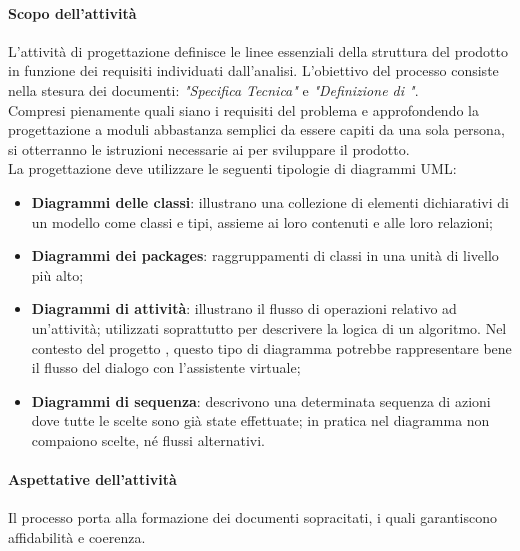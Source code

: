  \paragraph{Scopo dell'attività}
 L'attività di progettazione definisce le linee essenziali della struttura del prodotto  in
 funzione dei requisiti individuati dall'analisi. L'obiettivo del processo consiste nella stesura dei
 documenti: \textit{"Specifica Tecnica"} e \textit{"Definizione di "}. \\
 Compresi pienamente quali siano i requisiti del problema e approfondendo la progettazione a moduli
 abbastanza semplici da essere capiti da una sola persona, si otterranno le
 istruzioni necessarie ai \PRP{} per sviluppare il prodotto.\\
 La progettazione deve utilizzare le seguenti tipologie di diagrammi UML:
 \begin{itemize}
 	\item \textbf{Diagrammi delle classi}: illustrano una collezione di elementi dichiarativi di un modello	come classi e tipi, assieme ai loro contenuti e alle loro relazioni;
 	\item \textbf{Diagrammi dei packages}: raggruppamenti di classi in una unità di livello più alto;
 	\item \textbf{Diagrammi di attività}: illustrano il flusso di operazioni relativo ad un’attività; utilizzati	soprattutto per descrivere la logica di un algoritmo. Nel contesto del progetto \PROGETTO, questo tipo di diagramma potrebbe rappresentare bene il flusso del dialogo con l'assistente virtuale;
 	\item \textbf{Diagrammi di sequenza}: descrivono una determinata sequenza di azioni dove tutte le
 	scelte sono già state effettuate; in pratica nel diagramma non compaiono scelte, né flussi
 	alternativi.
 \end{itemize}
 \paragraph{Aspettative dell'attività}
 Il processo porta alla formazione dei documenti sopracitati, i quali garantiscono affidabilità e
 coerenza.
